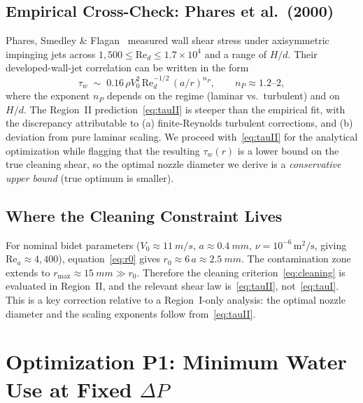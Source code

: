 \documentclass[aps,prfluids,reprint,amsmath,amssymb,floatfix]{revtex4-2}
\newcommand{\Rey}{\mathrm{Re}}
\begin{document}
\subsection{Empirical Cross-Check: Phares et al.~(2000)}

Phares, Smedley \& Flagan~\citep{Phares2000} measured wall shear stress
under axisymmetric impinging jets across $1{,}500 \leq \Rey_d \leq 1.7\times 10^4$
and a range of $H/d$. Their developed-wall-jet correlation can be written
in the form
\begin{equation}
  \tau_w \;\sim\; 0.16\,\rho V_0^2\,\Rey_d^{-1/2}\,(a/r)^{n_P},
  \qquad n_P \approx 1.2\text{--}2,
  \label{eq:phares}
\end{equation}
where the exponent $n_P$ depends on the regime (laminar vs.\ turbulent)
and on $H/d$. The Region~II prediction~\eqref{eq:tauII} is steeper than the
empirical fit, with the discrepancy attributable to (a) finite-Reynolds
turbulent corrections, and (b) deviation from pure laminar scaling. We
proceed with~\eqref{eq:tauII} for the analytical optimization while flagging
that the resulting $\tau_w(r)$ is a lower bound on the true cleaning
shear, so the optimal nozzle diameter we derive is a \emph{conservative
upper bound} (true optimum is smaller).

\subsection{Where the Cleaning Constraint Lives}

For nominal bidet parameters
($V_0 \approx \SI{11}{m/s}$, $a \approx \SI{0.4}{mm}$, $\nu = 10^{-6}\,\mathrm{m^2/s}$,
giving $\Rey_a \approx 4{,}400$), equation~\eqref{eq:r0} gives
$r_0 \approx 6\,a \approx \SI{2.5}{mm}$. The contamination zone extends to
$r_\mathrm{max} \approx \SI{15}{mm} \gg r_0$. Therefore the cleaning
criterion~\eqref{eq:cleaning} is evaluated in Region~II, and the relevant
shear law is~\eqref{eq:tauII}, not~\eqref{eq:tauI}. This is a key
correction relative to a Region~I-only analysis: the optimal nozzle
diameter and the scaling exponents follow from~\eqref{eq:tauII}.

\section{Optimization P1: Minimum Water Use at Fixed $\Delta P$}
\label{sec:P1}
\end{document}
